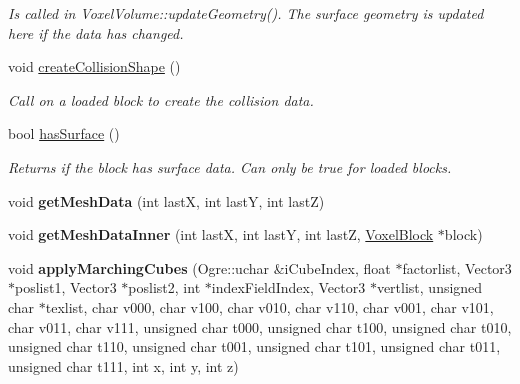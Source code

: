 \begin{DoxyCompactItemize}
\begin{DoxyCompactList}\small\item\em \-Is called in \-Voxel\-Volume\-::update\-Geometry(). \-The surface geometry is updated here if the data has changed. \end{DoxyCompactList}\item 
\hypertarget{classVoxelBlockPersistent_afa55f888758a21699c683effc826d81e}{
void \hyperlink{classVoxelBlockPersistent_afa55f888758a21699c683effc826d81e}{create\-Collision\-Shape} ()}
\label{dd/d36/classVoxelBlockPersistent_afa55f888758a21699c683effc826d81e}

\begin{DoxyCompactList}\small\item\em \-Call on a loaded block to create the collision data. \end{DoxyCompactList}\item 
\hypertarget{classVoxelBlockPersistent_a49e55e63733b907683031aa531ed41ff}{
bool \hyperlink{classVoxelBlockPersistent_a49e55e63733b907683031aa531ed41ff}{has\-Surface} ()}
\label{dd/d36/classVoxelBlockPersistent_a49e55e63733b907683031aa531ed41ff}

\begin{DoxyCompactList}\small\item\em \-Returns if the block has surface data. \-Can only be true for loaded blocks. \end{DoxyCompactList}\item 
\hypertarget{classVoxelBlockPersistent_a9316b3528e8ed5b4055c7732a130cf94}{
void {\bfseries get\-Mesh\-Data} (int last\-X, int last\-Y, int last\-Z)}
\label{dd/d36/classVoxelBlockPersistent_a9316b3528e8ed5b4055c7732a130cf94}

\item 
\hypertarget{classVoxelBlockPersistent_a93cd49dbd33a047ee4cccaca118af1fb}{
void {\bfseries get\-Mesh\-Data\-Inner} (int last\-X, int last\-Y, int last\-Z, \hyperlink{classVoxelBlock}{\-Voxel\-Block} $\ast$block)}
\label{dd/d36/classVoxelBlockPersistent_a93cd49dbd33a047ee4cccaca118af1fb}

\item 
\hypertarget{classVoxelBlockPersistent_a43b8558272eb0c01f07f2e5a74a45087}{
void {\bfseries apply\-Marching\-Cubes} (\-Ogre\-::uchar \&i\-Cube\-Index, float $\ast$factorlist, \-Vector3 $\ast$poslist1, \-Vector3 $\ast$poslist2, int $\ast$index\-Field\-Index, \-Vector3 $\ast$vertlist, unsigned char $\ast$texlist, char v000, char v100, char v010, char v110, char v001, char v101, char v011, char v111, unsigned char t000, unsigned char t100, unsigned char t010, unsigned char t110, unsigned char t001, unsigned char t101, unsigned char t011, unsigned char t111, int x, int y, int z)}
\label{dd/d36/classVoxelBlockPersistent_a43b8558272eb0c01f07f2e5a74a45087}


\end{DoxyCompactItemize}
